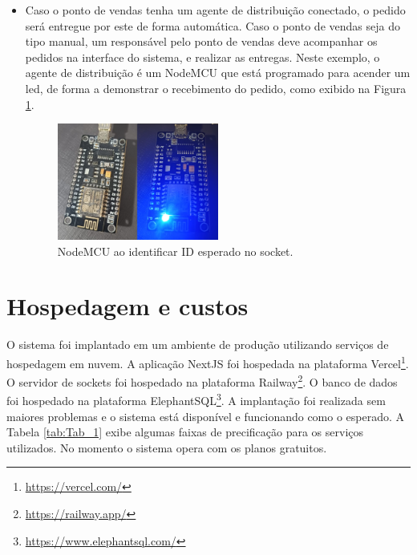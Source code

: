 \begin{itemize}
    \item Caso o ponto de vendas tenha um agente de distribuição conectado, o pedido será entregue por este de forma automática. Caso o ponto de vendas seja do tipo manual, um responsável pelo ponto de vendas deve acompanhar os pedidos na interface do sistema, e realizar as entregas. Neste exemplo, o agente de distribuição é um NodeMCU que está programado para acender um led, de forma a demonstrar o recebimento do pedido, como exibido na Figura \ref{fig:nodeled}.

    \begin{figure}
    	\caption{\label{fig:nodeled}NodeMCU ao identificar ID esperado no socket.}
    	\begin{center}
    		\includegraphics[width=0.5\textwidth]{figuras/nodemcunotification.png}
    	\end{center}
    \end{figure}
    
\end{itemize}

\section{Hospedagem e custos}\label{cap:host}

O sistema foi implantado em um ambiente de produção utilizando serviços de hospedagem em nuvem. A aplicação NextJS foi hospedada na plataforma Vercel\footnote{\url{https://vercel.com/}}. O servidor de sockets foi hospedado na plataforma Railway\footnote{\url{https://railway.app/}}. O banco de dados foi hospedado na plataforma ElephantSQL\footnote{\url{https://www.elephantsql.com/}}. A implantação foi realizada sem maiores problemas e o sistema está disponível e funcionando como o esperado. A Tabela \ref{tab:Tab_1} exibe algumas faixas de precificação para os serviços utilizados. No momento o sistema opera com os planos gratuitos.

